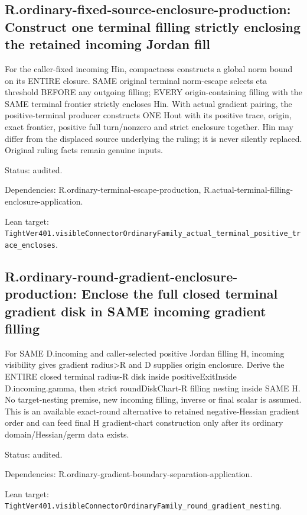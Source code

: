 \documentclass{article}
\begin{document}
\subsection*{R.ordinary-fixed-source-enclosure-production: Construct one terminal filling strictly enclosing the retained incoming Jordan fill}
For the caller-fixed incoming Hin, compactness constructs a global norm bound on its ENTIRE closure. SAME original terminal norm-escape selects eta threshold BEFORE any outgoing filling; EVERY origin-containing filling with the SAME terminal frontier strictly encloses Hin. With actual gradient pairing, the positive-terminal producer constructs ONE Hout with its positive trace, origin, exact frontier, positive full turn/nonzero and strict enclosure together. Hin may differ from the displaced source underlying the ruling; it is never silently replaced. Original ruling facts remain genuine inputs.
\par Status: audited.
\par Dependencies: R.ordinary-terminal-escape-production, R.actual-terminal-filling-enclosure-application.
\par Lean target: \texttt{TightVer401.visibleConnectorOrdinaryFamily\_actual\_terminal\_positive\_trace\_encloses}.
\subsection*{R.ordinary-round-gradient-enclosure-production: Enclose the full closed terminal gradient disk in SAME incoming gradient filling}
For SAME D.incoming and caller-selected positive Jordan filling H, incoming visibility gives gradient radius>R and D supplies origin enclosure. Derive the ENTIRE closed terminal radius-R disk inside positiveExitInside D.incoming.gamma, then strict roundDiskChart-R filling nesting inside SAME H. No target-nesting premise, new incoming filling, inverse or final scalar is assumed. This is an available exact-round alternative to retained negative-Hessian gradient order and can feed final H gradient-chart construction only after its ordinary domain/Hessian/germ data exists.
\par Status: audited.
\par Dependencies: R.ordinary-gradient-boundary-separation-application.
\par Lean target: \texttt{TightVer401.visibleConnectorOrdinaryFamily\_round\_gradient\_nesting}.
\end{document}
